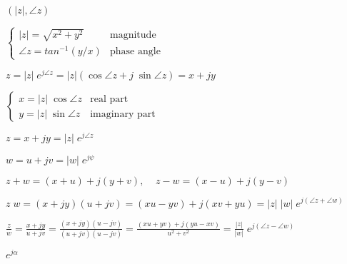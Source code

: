 \documentclass{article}
\def\lthtmlcheckvsize{\ifdim\ht\sizebox<\vsize 
  \ifdim\wd\sizebox<\hsize\expandafter\hfill\fi \expandafter\vfill
  \else\expandafter\vss\fi}%
\begin{document}
{\newpage\clearpage
{}%
$ (|z|,\angle z)$%
\lthtmlindisplaymathZ
\lthtmlcheckvsize\clearpage}

{\newpage\clearpage
{}%
$\displaystyle \left\{ \begin{array}{ll} |z|=\sqrt{x^2+y^2} & \mbox{magnitude}\\
\angle z=tan^{-1} (y/x) & \mbox{phase angle}
\end{array} \right.$%
\lthtmlindisplaymathZ
\lthtmlcheckvsize\clearpage}

{\newpage\clearpage
{}%
$\displaystyle z=|z|\;e^{j\angle z}=|z|(\cos\angle z+j\;\sin\angle z)=x+jy$%
\lthtmlindisplaymathZ
\lthtmlcheckvsize\clearpage}

{\newpage\clearpage
{}%
$\displaystyle \left\{ \begin{array}{ll} x=|z|\;\cos\angle z & \mbox{real part}\\
y=|z|\;\sin\angle z & \mbox{imaginary part}
\end{array} \right.$%
\lthtmlindisplaymathZ
\lthtmlcheckvsize\clearpage}

{\newpage\clearpage
{}%
$ z=x+jy=|z|\;e^{j\angle z}$%
\lthtmlindisplaymathZ
\lthtmlcheckvsize\clearpage}

{\newpage\clearpage
{}%
$ w=u+jv=|w|\;e^{j\psi}$%
\lthtmlindisplaymathZ
\lthtmlcheckvsize\clearpage}

{\newpage\clearpage
{}%
$\displaystyle z+w=(x+u)+j(y+v),\;\;\;\;z-w=(x-u)+j(y-v)$%
\lthtmlindisplaymathZ
\lthtmlcheckvsize\clearpage}

{\newpage\clearpage
{}%
$\displaystyle z\;w=(x+jy)(u+jv)=(xu-yv)+j(xv+yu)=|z|\;|w|\;e^{j(\angle z+\angle w)}$%
\lthtmlindisplaymathZ
\lthtmlcheckvsize\clearpage}

{\newpage\clearpage
{}%
$\displaystyle \frac{z}{w}=\frac{x+jy}{u+jv}=\frac{(x+jy)(u-jv)}{(u+jv)(u-jv)}
=\frac{(xu+yv)+j(yu-xv)}{u^2+v^2}
=\frac{|z|}{|w|}\;e^{j(\angle z-\angle w)}$%
\lthtmlindisplaymathZ
\lthtmlcheckvsize\clearpage}

{\newpage\clearpage
{}%
$ e^{j\alpha}$%
\lthtmlindisplaymathZ
\lthtmlcheckvsize\clearpage}
\end{document}
